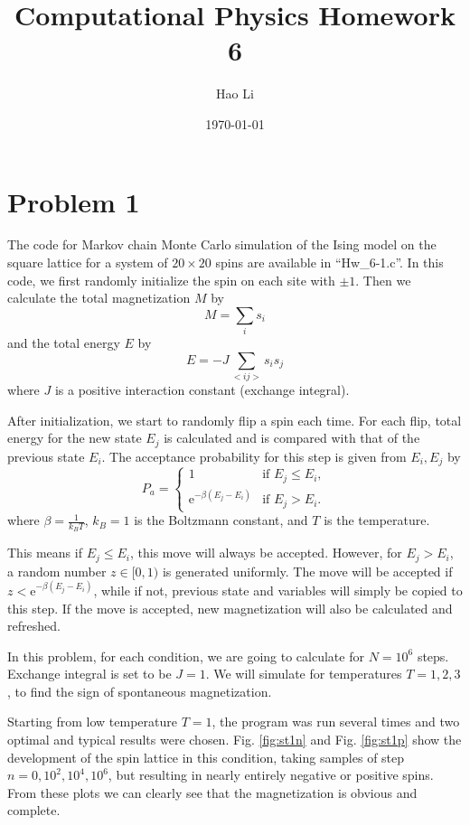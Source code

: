 \documentclass[12pt, graphicx]{article}
\begin{document}
\title{Computational Physics Homework 6}
\author{Hao Li\footnotemark[2]}
\date{\today}


\maketitle

\section*{Problem 1}
The code for Markov chain Monte Carlo simulation of the Ising model on the square lattice for a system of $20\times 20$ spins are available in \textquotedblleft Hw\_6-1.c\textquotedblright. In this code, we first randomly initialize the spin on each site with $\pm 1$. Then we calculate the total magnetization $M$ by 
\begin{equation}
M=\sum_is_i
\end{equation}
and the total energy $E$ by 
\begin{equation}
E=-J\sum_{<ij>}s_is_j
\end{equation}
where $J$ is a positive interaction constant (exchange integral). \par
After initialization, we start to randomly flip a spin each time. For each flip, total energy for the new state $E_j$ is calculated and is compared with that of the previous state $E_i$. The acceptance probability for this step is given from $E_i, E_j$ by 
\begin{equation}
P_a= \begin{cases} 
1 & \mbox{if } E_j\leq E_i, \\
\mathrm{e}^{-\beta(E_j-E_i)} & \mbox{if } E_j>E_i.
\end{cases}
\label{eq:Pa}
\end{equation}
where $\beta=\frac{1}{k_BT}$, $k_B=1$ is the Boltzmann constant, and $T$ is the temperature.\par
This means if $E_j\leq E_i$, this move will always be accepted. However, for $E_j>E_i$, a random number $z\in[0,1)$ is generated uniformly. The move will be accepted if $z<\mathrm{e}^{-\beta(E_j-E_i)}$, while if not, previous state and variables will simply be copied to this step. If the move is accepted, new magnetization will also be calculated and refreshed. \par
In this problem, for each condition, we are going to calculate for $N=10^6$ steps. Exchange integral is set to be $J=1$. We will simulate for temperatures $T=1, 2, 3$, to find the sign of spontaneous magnetization.\par
Starting from low temperature $T=1$, the program was run several times and two optimal and typical results were chosen. Fig. \ref{fig:st1n} and Fig. \ref{fig:st1p} show the development of the spin lattice in this condition, taking samples of step $n=0,10^2,10^4,10^6$, but resulting in nearly entirely negative or positive spins. From these plots we can clearly see that the magnetization is obvious and complete.\par
\end{document}
